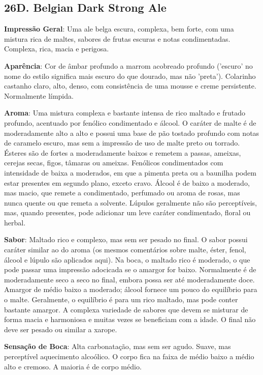 \subsection*{26D. Belgian Dark Strong Ale}

\textbf{Impressão Geral}: Uma ale belga escura, complexa, bem forte, com uma mistura rica de maltes, sabores de frutas escuras e notas condimentadas. Complexa, rica, macia e perigosa.

\textbf{Aparência}: Cor de âmbar profundo a marrom acobreado profundo ('escuro' no nome do estilo significa mais escuro do que dourado, mas não 'preta'). Colarinho castanho claro, alto, denso, com consistência de uma mousse e creme persistente. Normalmente límpida.

\textbf{Aroma}: Uma mistura complexa e bastante intensa de rico maltado e frutado profundo, acentuado por fenólico condimentado e álcool. O caráter de malte é de moderadamente alto a alto e possui uma base de pão tostado profundo com notas de caramelo escuro, mas sem a impressão de uso de malte preto ou torrado. Ésteres são de fortes a moderadamente baixos e remetem a passas, ameixas, cerejas secas, figos, tâmaras ou ameixas. Fenólicos condimentados com intensidade de baixa a moderados, em que a pimenta preta ou a baunilha podem estar presentes em segundo plano, exceto cravo. Álcool é de baixo a moderado, mas macio, que remete a condimentado, perfumado ou aroma de rosas, mas nunca quente ou que remeta a solvente. Lúpulos geralmente não são perceptíveis, mas, quando presentes, pode adicionar um leve caráter condimentado, floral ou herbal.

\textbf{Sabor}: Maltado rico e complexo, mas sem ser pesado no final. O sabor possui caráter similar ao do aroma (os mesmos comentários sobre malte, éster, fenol, álcool e lúpulo são aplicados aqui). Na boca, o maltado rico é moderado, o que pode passar uma impressão adocicada se o amargor for baixo. Normalmente é de moderadamente seco a seco no final, embora possa ser até moderadamente doce. Amargor de médio baixo a moderado; álcool fornece um pouco do equilíbrio para o malte. Geralmente, o equilíbrio é para um rico maltado, mas pode conter bastante amargor. A complexa variedade de sabores que devem se misturar de forma macia e harmoniosa e muitas vezes se beneficiam com a idade. O final não deve ser pesado ou similar a xarope.

\textbf{Sensação de Boca}: Alta carbonatação, mas sem ser agudo. Suave, mas perceptível aquecimento alcoólico. O corpo fica na faixa de médio baixo a médio alto e cremoso. A maioria é de corpo médio.

